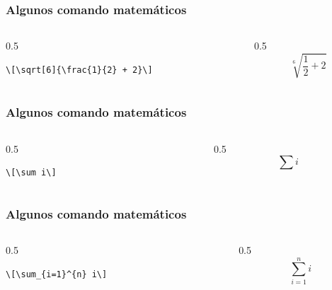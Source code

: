 \documentclass[12pt,aspectratio=169,ignorenonframetext]{ltxbeamer}
\begin{document}
\begin{frame}[fragile]
\frametitle{Algunos comando matemáticos}

\begin{columns}
    \begin{column}{0.5\textwidth}
        \begin{verbatim}
\[\sqrt[6]{\frac{1}{2} + 2}\]
        \end{verbatim}
    \end{column}
    {\color{gray} \vline}
    \begin{column}{0.5\textwidth}
        \[\sqrt[6]{\frac{1}{2} + 2}\]
    \end{column}
\end{columns}
\end{frame}





\begin{frame}[fragile]
\frametitle{Algunos comando matemáticos}

\begin{columns}
    \begin{column}{0.5\textwidth}
        \begin{verbatim}
\[\sum i\]
        \end{verbatim}
    \end{column}
    {\color{gray} \vline}
    \begin{column}{0.5\textwidth}
        \[\sum i\]
    \end{column}
\end{columns}
\end{frame}





\begin{frame}[fragile]
\frametitle{Algunos comando matemáticos}

\begin{columns}
    \begin{column}{0.5\textwidth}
        \begin{verbatim}
\[\sum_{i=1}^{n} i\]
        \end{verbatim}
    \end{column}
    {\color{gray} \vline}
    \begin{column}{0.5\textwidth}
        \[\sum_{i=1}^{n} i\]
    \end{column}
\end{columns}
\end{frame}
\end{document}
